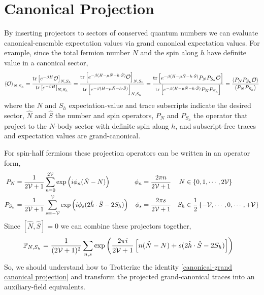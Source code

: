 \section{Canonical Projection}\label{sec:canonical projection}

By inserting projectors to sectors of conserved quantum numbers we can evaluate canonical-ensemble expectation values via grand canonical expectation values.
For example, since the total fermion number $N$ and the spin along $h$ have definite value in a canonical sector,
\begin{align}
	\left\langle \mathcal{O} \right\rangle_{N, S_h}
	=
	\frac{\text{tr}\left[ e^{-\beta H} \mathcal{O}\right]_{N, S_h}}{\text{tr}\left[ e^{-\beta H}\right]_{N, S_h}}
	=
	\frac{\text{tr}\left[ e^{-\beta (H-\mu \hat{N}-h \cdot \hat{S})} \mathcal{O} \right]_{N, S_h}}{\text{tr}\left[ e^{-\beta (H-\mu \hat{N}-h \cdot \hat{S})}\right]_{N, S_h}} 
	=
	\frac{\text{tr}\left[ e^{-\beta (H-\mu\hat{N}-h\cdot \hat{S})} P_N P_{S_h} \mathcal{O}\right]}{\text{tr}\left[ e^{-\beta (H - \mu \hat{N} - h \cdot \hat{S})} P_N P_{S_h}\right]}
	=
	\frac{\left\langle P_N P_{S_h} \mathcal{O} \right\rangle}{\left\langle P_N P_{S_h} \right\rangle}
	\label{eq:canonical-grand canonical projection}
\end{align}
where the $N$ and $S_h$ expectation-value and trace subscripts indicate the desired sector, $\hat{N}$ and $\hat{S}$ the number and spin operators, $P_N$ and $P_{S_h}$ the operator that project to the $N$-body sector with definite spin along $h$, and subscript-free traces and expectation values are grand-canonical.

For spin-half fermions these projection operators can be written in an operator form,
\begin{align}
	P_N &= \frac{1}{2\mathcal{V}+1} \sum_{n=0}^{2\mathcal{V}} \exp\left(i \phi_n (\hat{N}-N)\right)
	&
	\phi_n &= \frac{2\pi n}{2\mathcal{V}+1}
	&
	N &\in \left\{0, 1, \cdots, 2\mathcal{V}\right\}
	\\
	P_{S_h} &= \frac{1}{2\mathcal{V}+1} \sum_{s=-\mathcal{V}}^{\mathcal{V}} \exp\left(i \phi_s (2 \hat{h}\cdot \hat{S} - 2 S_h )\right)
	&
	\phi_s &= \frac{2\pi s}{2\mathcal{V}+1}
	&
	S_h &\in \frac{1}{2} \left\{ -\mathcal{V}, \cdots, 0, \cdots, +\mathcal{V}\right\}
\end{align}
Since $[\hat{N}, \hat{S}]=0$ we can combine these projectors together,
\begin{align}
	\mathbb{P}_{N, S_h} &= \frac{1}{(2\mathcal{V}+1)^2} \sum_{n,s} \exp\left(\frac{2\pi i}{2\mathcal{V}+1}\left[ n (\hat{N}-N) + s (2\hat{h}\cdot\hat{S} - 2 S_h)\right]\right)
\end{align}
So, we should understand how to Trotterize the identity \eqref{canonical-grand canonical projection} and transform the projected grand-canonical traces into an auxiliary-field equivalents.

